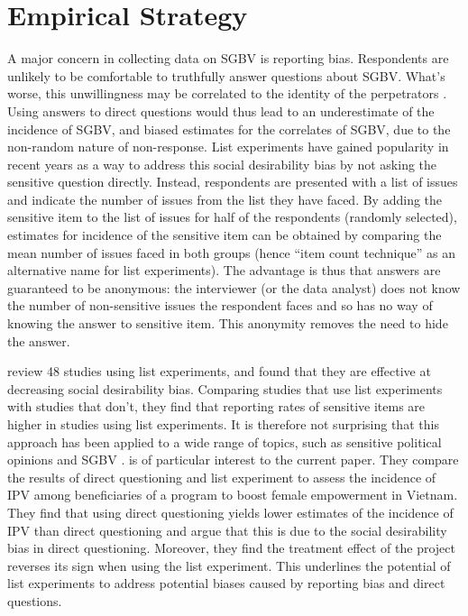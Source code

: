 \documentclass[10pt,a4paper,abstract=on]{scrartcl} %
\begin{document}
\section*{Empirical Strategy}
A major concern in collecting data on SGBV is reporting bias. Respondents are unlikely to be comfortable to truthfully answer questions about SGBV. What's worse, this unwillingness may be correlated to the identity of the perpetrators \citep{Stark2017}. Using answers to direct questions would thus lead to an underestimate of the incidence of SGBV, and biased estimates for the correlates of SGBV, due to the non-random nature of non-response. List experiments have gained popularity in recent years as a way to address this social desirability bias by not asking the sensitive question directly. Instead, respondents are presented with a list of issues and indicate the number of issues from the list they have faced. By adding the sensitive item to the list of issues for half of the respondents (randomly selected), estimates for incidence of the sensitive item can be obtained by comparing the mean number of issues faced in both groups (hence ``item count technique'' as an alternative name for list experiments). The advantage is thus that answers are guaranteed to be anonymous: the interviewer (or the data analyst) does not know the number of non-sensitive issues the respondent faces and so has no way of knowing the answer to sensitive item. This anonymity removes the need to hide the answer. 

\cite{Holbrook2010} review 48 studies using list experiments, and found that they are effective at decreasing social desirability bias. Comparing studies that use list experiments with studies that don't, they find that reporting rates of sensitive items are higher in studies using list experiments. It is therefore not surprising that this approach has been applied to a wide range of topics, such as sensitive political opinions \citep{Frye2017,Blair2014,Meng2017} and SGBV \citep{Bulte2019}. \cite{Bulte2019} is of particular interest to the current paper. They compare the results of direct questioning and list experiment to assess the incidence of IPV among beneficiaries of a program to boost female empowerment in Vietnam. They find that using direct questioning yields lower estimates of the incidence of IPV than direct questioning and argue that this is due to the social desirability bias in direct questioning. Moreover, they find the treatment effect of the project reverses its sign when using the list experiment. This underlines the potential of list experiments to address potential biases caused by reporting bias and direct questions.
\end{document}
